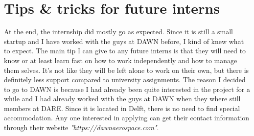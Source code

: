 \chapter{Tips \& tricks for future interns}

At the end, the internship did mostly go as expected. Since it is still a small startup and I have worked with the guys at DAWN before, I kind of knew what to expect. The main tip I can give to any future interns is that they will need to know or at least learn fast on how to work independently and how to manage them selves. It's not like they will be left alone to work on their own, but there is definitely less support compared to university assignments. 
The reason I decided to go to DAWN is because I had already been quite interested in the project for a while and I had already worked with the guys at DAWN when they where still members at DARE. Since it is located in Delft, there is no need to find special accommodation. Any one interested in applying can get their contact information through their website \textit{"https://dawnaerospace.com"}.

